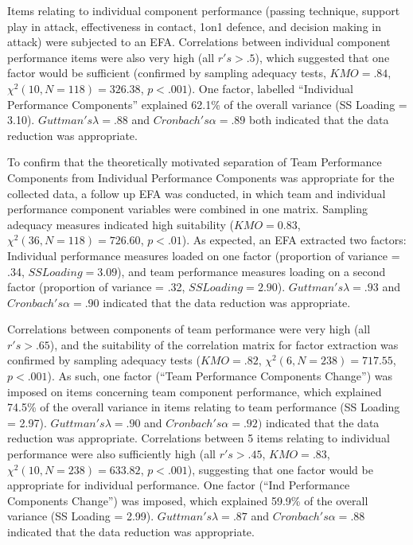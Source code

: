 \begin{CJK}{UTF8}{gbsn}

Items relating to individual component performance (passing technique, support play in attack, effectiveness in contact, 1on1 defence, and decision making in attack)  were subjected to an EFA.  Correlations between individual component performance items were also very high (all $r's > .5$), which suggested that one factor would be sufficient (confirmed by sampling adequacy tests, $KMO =  .84$, $\chi^2(10, N = 118) =  326.38$, $p < .001$).  One factor, labelled ``Individual Performance Components'' explained 62.1\% of the overall variance (SS Loading = 3.10).
$Guttman's \lambda =.88$ and $Cronbach's  \alpha = .89$ both indicated that the data reduction was appropriate.


To confirm that the theoretically motivated separation of Team Performance Components from Individual Performance Components was appropriate for the collected data, a follow up EFA was conducted, in which team and individual performance component variables were combined in one matrix.  Sampling adequacy measures indicated high suitability ($KMO = 0.83$, $\chi^2(36, N = 118) = 726.60$, $p < .01$).  As expected, an EFA extracted two factors: Individual performance measures loaded on one factor (proportion of variance = .34, $SS Loading = 3.09$), and team performance measures loading on a second factor (proportion of variance = .32, $SS Loading = 2.90$). $Guttman's \lambda =.93$ and $Cronbach's \alpha = .90$ indicated that the data reduction was appropriate.

Correlations between components of team performance were very high (all $r's > .65$), and the suitability of the correlation matrix for factor extraction was confirmed by sampling adequacy tests ($KMO = .82$, $\chi^2(6, N = 238) = 717.55$, $p < .001$).  As such, one factor (``Team Performance Components Change'') was imposed on items concerning team component performance, which explained 74.5\% of the overall variance in items relating to team performance (SS Loading = 2.97). $Guttman's \lambda =.90$ and $Cronbach's \alpha = .92)$ indicated that the data reduction was appropriate.  Correlations between 5 items relating to individual performance were also sufficiently high (all $r's > .45$, $KMO = .83$, $\chi^2(10, N = 238) = 633.82$, $p < .001$), suggesting that one factor would be appropriate for individual performance.  One factor (``Ind Performance Components Change'') was imposed, which explained 59.9\% of the overall variance (SS Loading = 2.99).  $Guttman's \lambda =.87$ and $Cronbach's \alpha = .88$ indicated that the data reduction was appropriate.


\end{CJK}
